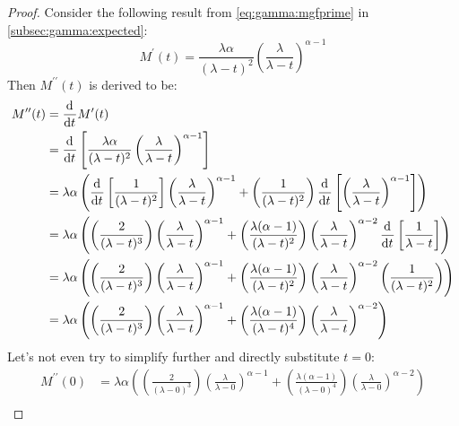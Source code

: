 \documentclass[12pt]{article}
\begin{document}
\begin{proof}
	Consider the following result from \autoref{eq:gamma:mgfprime} in \autoref{subsec:gamma:expected}:
	\begin{equation}
		M^\prime(t) = \frac{\lambda\alpha}{(\lambda - t)^2}\left(\frac{\lambda}{\lambda - t}\right)^{\alpha-1}
	\end{equation}
	Then $M^{\prime\prime}(t)$ is derived to be:\vspace*{-12pt}
	\begin{equation}
		\begin{split}
			M^{\prime\prime}(t)	&=	\mathop{}\!\frac{\mathrm{d}^{}}{\mathrm{d}t^{}}M^\prime(t)\\
								&=	\mathop{}\!\frac{\mathrm{d}^{}}{\mathrm{d}t^{}}\left[\frac{\lambda\alpha}{(\lambda - t)^2}\left(\frac{\lambda}{\lambda - t}\right)^{\alpha-1}\right]\\
								&=	\lambda\alpha\left(\mathop{}\!\frac{\mathrm{d}^{}}{\mathrm{d}t^{}}\left[\frac{1}{(\lambda - t)^2}\right]\left(\frac{\lambda}{\lambda - t}\right)^{\alpha-1} + \left(\frac{1}{(\lambda - t)^2}\right)\mathop{}\!\frac{\mathrm{d}^{}}{\mathrm{d}t^{}}\left[\left(\frac{\lambda}{\lambda - t}\right)^{\alpha-1}\right]\right)\\
								&=	\lambda\alpha\left(\left(\frac{2}{(\lambda-t)^3}\right)\left(\frac{\lambda}{\lambda - t}\right)^{\alpha-1} + \left(\frac{\lambda(\alpha-1)}{(\lambda - t)^2}\right)\left(\frac{\lambda}{\lambda-t}\right)^{\alpha-2}\mathop{}\!\frac{\mathrm{d}^{}}{\mathrm{d}t^{}}\left[\frac{1}{\lambda-t}\right]\right)\\
								&=	\lambda\alpha\left(\left(\frac{2}{(\lambda-t)^3}\right)\left(\frac{\lambda}{\lambda - t}\right)^{\alpha-1} + \left(\frac{\lambda(\alpha-1)}{(\lambda - t)^2}\right)\left(\frac{\lambda}{\lambda-t}\right)^{\alpha-2}\left(\frac{1}{(\lambda-t)^2}\right)\right)\\
								&=	\lambda\alpha\left(\left(\frac{2}{(\lambda-t)^3}\right)\left(\frac{\lambda}{\lambda - t}\right)^{\alpha-1} + \left(\frac{\lambda(\alpha-1)}{(\lambda - t)^4}\right)\left(\frac{\lambda}{\lambda-t}\right)^{\alpha-2}\right)
		\end{split}
	\end{equation}
	Let's not even try to simplify further and directly substitute $t=0$:\vspace*{-12pt}
	\begin{equation}
		\begin{split}
			M^{\prime\prime}(0)	&=	\lambda\alpha\left(\left(\frac{2}{(\lambda-0)^3}\right)\left(\frac{\lambda}{\lambda - 0}\right)^{\alpha-1} + \left(\frac{\lambda(\alpha-1)}{(\lambda - 0)^4}\right)\left(\frac{\lambda}{\lambda-0}\right)^{\alpha-2}\right)\\

\end{split}
\end{equation}
\end{proof}
\end{document}
